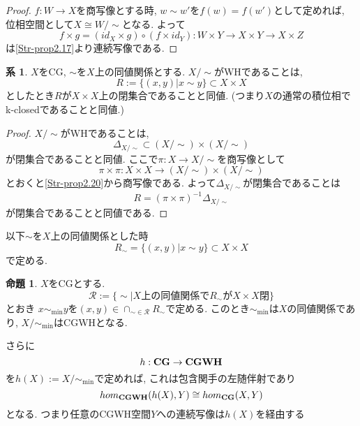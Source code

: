 \documentclass[dvipdfmx,a4paper,11pt]{article}
\theoremstyle{definition}
\newtheorem{prop}[thm]{命題}
\newtheorem{cor}[thm]{系}
\begin{document}
\begin{proof}
$f : W \to X$を商写像とする時, $w \sim w'$を$f(w) = f(w')$として定めれば, 
位相空間として$X \cong W/\sim$となる. 
よって
$$
f \times g = (id_X \times g) \circ (f \times id_Y):
W \times Y \to X \times Y \to X \times Z
$$
は\ref{Str-prop2.17}より連続写像である.
\end{proof}

 \begin{tcolorbox}
 [colback = white, colframe = green!35!black, fonttitle = \bfseries,breakable = true]
\begin{cor}\cite[Cor2.21]{Str}
\label{Str-cor2.21}
$X$をCG, $\sim$を$X$上の同値関係とする. 
$X/\sim $がWHであることは, 
$$
R:= \{ (x,y)| x \sim y\} \subset X \times X
$$
としたとき$R$が$X \times X$上の閉集合であることと同値.
(つまり$X$の通常の積位相でk-closedであることと同値.)
\end{cor}
\end{tcolorbox}
\begin{proof}
$X/\sim $がWHであることは,
$$
\Delta_{X/\sim} \subset (X/\sim) \times (X/\sim)
$$
が閉集合であることと同値.
ここで$\pi : X \to X/\sim$を商写像として
$$
\pi \times \pi : X \times X \to (X/\sim) \times (X/\sim)
$$
とおくと\ref{Str-prop2.20}から商写像である.
よって$\Delta_{X/\sim} $が閉集合であることは
$$
R = (\pi \times \pi )^{-1}\Delta_{X/\sim} 
$$
が閉集合であることと同値である.
\end{proof}

以下$\sim$を$X$上の同値関係とした時
$$
R_{\sim}= \{ (x,y)| x \sim y\} \subset X \times X
$$
で定める.
 \begin{tcolorbox}
 [colback = white, colframe = green!35!black, fonttitle = \bfseries,breakable = true]
\begin{prop}\cite[Prop2.22]{Str}
$X$をCGとする.
$$
\mathcal{R}:=\{\sim | \text{$X$上の同値関係で$R_{\sim}$が$X \times X$閉} \}
$$
とおき
$x \sim_{\min} y$を$(x,y) \in \cap_{\sim \in \mathcal{R}} R_{\sim}$で定める.
このとき$\sim_{\min}$は$X$の同値関係であり, $X/\sim_{\min}$はCGWHとなる.

さらに
$$
h : {\bf CG } \to {\bf CGWH}
$$
を$h(X) := X/\sim_{\min}$で定めれば, これは包含関手の左随伴射であり
$$
hom_{{\bf CGWH}}(h(X), Y) \cong hom_{{\bf CG}}(X, Y)
$$
となる. 
つまり任意のCGWH空間$Y$への連続写像は$h(X)$を経由する

\end{prop}
\end{tcolorbox}
\end{document}
